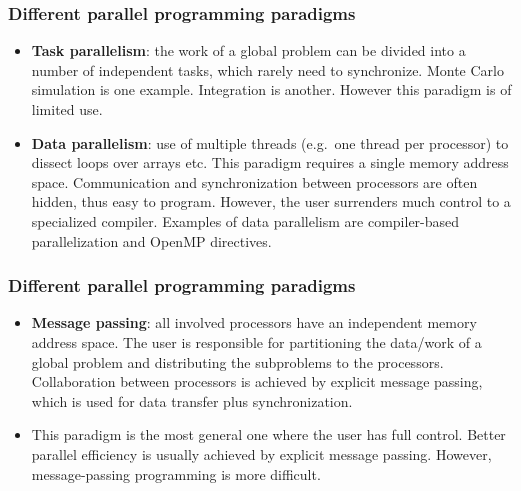 \documentclass{beamer}
\begin{document}
\begin{frame}
\frametitle{Different parallel programming paradigms}

\begin{block}{}

\begin{itemize}
\item \textbf{Task parallelism}:  the work of a global problem can be divided into a number of independent tasks, which rarely need to synchronize.  Monte Carlo simulation is one example. Integration is another. However this paradigm is of limited use.

\item \textbf{Data parallelism}:  use of multiple threads (e.g.~one thread per processor) to dissect loops over arrays etc.  This paradigm requires a single memory address space.  Communication and synchronization between processors are often hidden, thus easy to program. However, the user surrenders much control to a specialized compiler. Examples of data parallelism are compiler-based parallelization and OpenMP directives. 
\end{itemize}

\noindent
\end{block}
\end{frame}

\begin{frame}
\frametitle{Different parallel programming paradigms}

\begin{block}{}

\begin{itemize}
\item \textbf{Message passing}:  all involved processors have an independent memory address space. The user is responsible for  partitioning the data/work of a global problem and distributing the  subproblems to the processors. Collaboration between processors is achieved by explicit message passing, which is used for data transfer plus synchronization.

\item This paradigm is the most general one where the user has full control. Better parallel efficiency is usually achieved by explicit message passing. However, message-passing programming is more difficult.
\end{itemize}

\noindent
\end{block}
\end{frame}
\end{document}
